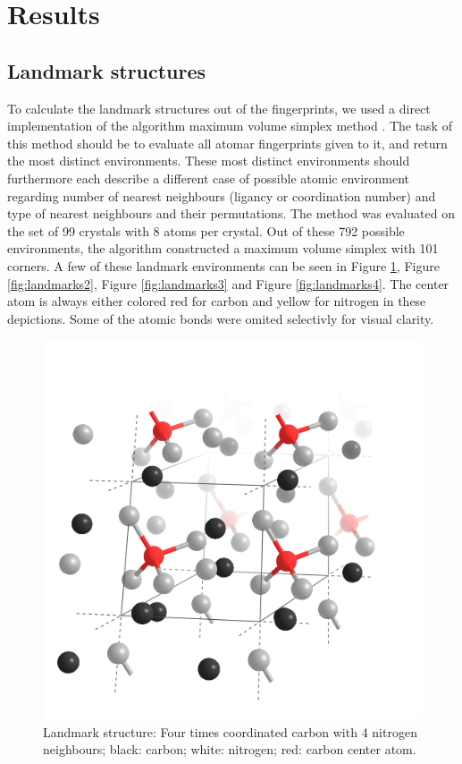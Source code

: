 \newpage
\section{Results}
\subsection{Landmark structures}

To calculate the landmark structures out of the fingerprints, we used a direct implementation of the algorithm maximum volume simplex method \cite{Behnam2020}. The task of this method should be to evaluate all atomar fingerprints given to it, and return the most distinct environments. These most distinct environments should furthermore each describe a different case of possible atomic environment regarding number of nearest neighbours (ligancy or coordination number) and type of nearest neighbours and their permutations. The method was evaluated on the set of 99 crystals with 8 atoms per crystal. Out of these 792 possible environments, the algorithm constructed a maximum volume simplex with 101 corners. A few of these landmark environments can be seen in Figure \ref{fig:landmarks1}, Figure \ref{fig:landmarks2}, Figure \ref{fig:landmarks3} and Figure \ref{fig:landmarks4}. The center atom is always either colored red for carbon and yellow for nitrogen in these depictions. Some of the atomic bonds were omited selectivly for visual clarity.


\begin{figure}[h!]

\center
\includegraphics[width=\linewidth]{Figures/landmark1.png}
\caption{Landmark structure: Four times coordinated carbon with 4 nitrogen neighbours; black: carbon; white: nitrogen; red: carbon center atom. }
\label{fig:landmarks1}
\end{figure}

